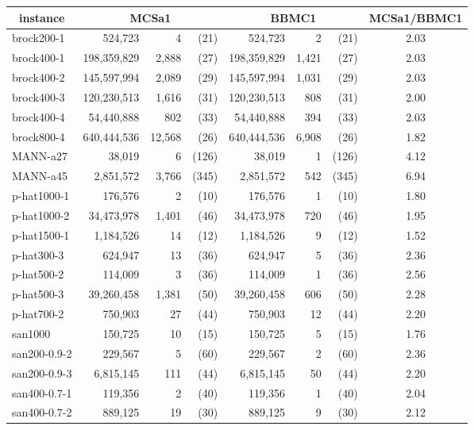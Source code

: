 \documentclass{l4proj}
\begin{document}
%
\begin{table}
\begin{center}
\begin{scriptsize}
\begin{tabular}{|l|r r r|r r r|c|} \hline 
\multicolumn{1}{|c|}{instance} & \multicolumn{3}{|c|}{MCSa1} & \multicolumn{3}{|c|}{BBMC1} & \multicolumn{1}{|c|}{MCSa1/BBMC1} \\ \hline
brock200-1 & 524,723 & 4 & (21) & 524,723 & 2 & (21) & 2.03   \\ 
brock400-1 & 198,359,829 & 2,888 & (27) & 198,359,829 & 1,421 & (27) & 2.03   \\ 
brock400-2 & 145,597,994 & 2,089 & (29) & 145,597,994 & 1,031 & (29) & 2.03   \\ 
brock400-3 & 120,230,513 & 1,616 & (31) & 120,230,513 & 808 & (31) & 2.00   \\ 
brock400-4 & 54,440,888 & 802 & (33) & 54,440,888 & 394 & (33) & 2.03   \\ 
brock800-4 & 640,444,536 & 12,568 & (26) & 640,444,536 & 6,908 & (26) & 1.82   \\ 
MANN-a27 & 38,019 & 6 & (126) & 38,019 & 1 & (126) & 4.12   \\ 
MANN-a45 & 2,851,572 & 3,766 & (345) & 2,851,572 & 542 & (345) & 6.94   \\ 
p-hat1000-1 & 176,576 & 2 & (10) & 176,576 & 1 & (10) & 1.80   \\ 
p-hat1000-2 & 34,473,978 & 1,401 & (46) & 34,473,978 & 720 & (46) & 1.95   \\ 
p-hat1500-1 & 1,184,526 & 14 & (12) & 1,184,526 & 9 & (12) & 1.52   \\ 
p-hat300-3 & 624,947 & 13 & (36) & 624,947 & 5 & (36) & 2.36   \\ 
p-hat500-2 & 114,009 & 3 & (36) & 114,009 & 1 & (36) & 2.56   \\ 
p-hat500-3 & 39,260,458 & 1,381 & (50) & 39,260,458 & 606 & (50) & 2.28   \\ 
p-hat700-2 & 750,903 & 27 & (44) & 750,903 & 12 & (44) & 2.20   \\ 
san1000 & 150,725 & 10 & (15) & 150,725 & 5 & (15) & 1.76   \\ 
san200-0.9-2 & 229,567 & 5 & (60) & 229,567 & 2 & (60) & 2.36   \\ 
san200-0.9-3 & 6,815,145 & 111 & (44) & 6,815,145 & 50 & (44) & 2.20   \\ 
san400-0.7-1 & 119,356 & 2 & (40) & 119,356 & 1 & (40) & 2.04   \\ 
san400-0.7-2 & 889,125 & 19 & (30) & 889,125 & 9 & (30) & 2.12   \\ 

\end{tabular}
\end{scriptsize}
\end{center}
\end{table}
\end{document}
